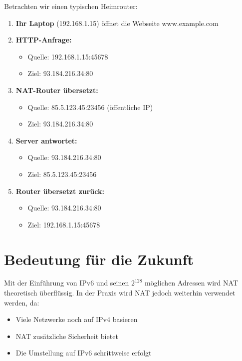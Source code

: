 \documentclass[
  nswissgerman,
  a4paper,
  DIV=11,
  numbers=noendperiod,
  ngerman]{scrreprt}
\providecommand{\tightlist}{%
  \setlength{\itemsep}{0pt}\setlength{\parskip}{0pt}}
\begin{document}
Betrachten wir einen typischen Heimrouter:

\begin{enumerate}
\def\labelenumi{\arabic{enumi}.}
\tightlist
\item
  \textbf{Ihr Laptop} (192.168.1.15) öffnet die Webseite www.example.com
\item
  \textbf{HTTP-Anfrage:}

  \begin{itemize}
  \tightlist
  \item
    Quelle: 192.168.1.15:45678
  \item
    Ziel: 93.184.216.34:80
  \end{itemize}
\item
  \textbf{NAT-Router übersetzt:}

  \begin{itemize}
  \tightlist
  \item
    Quelle: 85.5.123.45:23456 (öffentliche IP)
  \item
    Ziel: 93.184.216.34:80
  \end{itemize}
\item
  \textbf{Server antwortet:}

  \begin{itemize}
  \tightlist
  \item
    Quelle: 93.184.216.34:80
  \item
    Ziel: 85.5.123.45:23456
  \end{itemize}
\item
  \textbf{Router übersetzt zurück:}

  \begin{itemize}
  \tightlist
  \item
    Quelle: 93.184.216.34:80
  \item
    Ziel: 192.168.1.15:45678
  \end{itemize}
\end{enumerate}

\section{Bedeutung für die Zukunft}\label{bedeutung-fuxfcr-die-zukunft}

Mit der Einführung von IPv6 und seinen \(2^{128}\) möglichen Adressen
wird NAT theoretisch überflüssig. In der Praxis wird NAT jedoch
weiterhin verwendet werden, da:

\begin{itemize}
\tightlist
\item
  Viele Netzwerke noch auf IPv4 basieren
\item
  NAT zusätzliche Sicherheit bietet
\item
  Die Umstellung auf IPv6 schrittweise erfolgt
\end{itemize}
\end{document}
